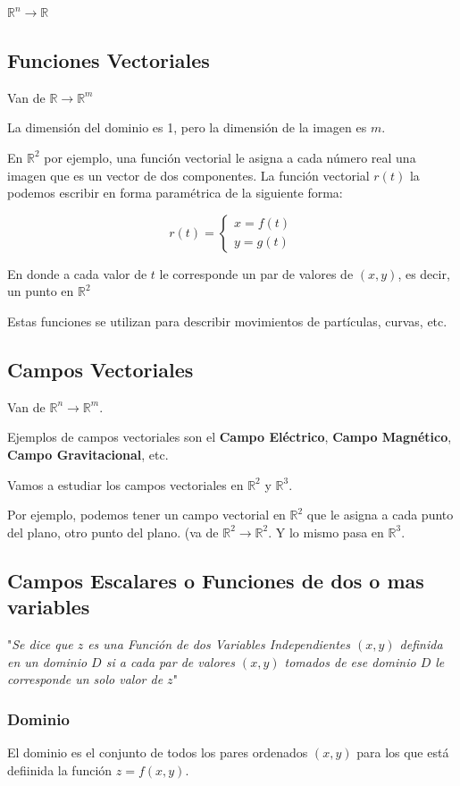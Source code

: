 \documentclass[12pt]{article}
\begin{document}
$ \mathbb{{R}}^n \to \mathbb{{R}} $

\subsection*{Funciones Vectoriales}
Van de $ \mathbb{{R}} \to \mathbb{{R}}^m $

La dimensión del dominio es 1, pero la dimensión de la imagen es $ m $.

En $ \mathbb{{R}}^2  $ por ejemplo, una función vectorial le asigna a cada número real una imagen que es un vector de dos componentes. La función vectorial $ r(t) $ la podemos escribir en forma paramétrica de la siguiente forma:

\[
	r(t) =
	\begin{cases}
		x = f(t) \\
		y = g(t)
	\end{cases}
\]

En donde a cada valor de $ t $ le corresponde un par de valores de $ (x,y) $, es decir, un punto en $ \mathbb{R}^{2} $

Estas funciones se utilizan para describir movimientos de partículas, curvas, etc.

\subsection*{Campos Vectoriales}
Van de $ \mathbb{R}^{n}\to\mathbb{R}^{m} $.

Ejemplos de campos vectoriales son el \textbf{Campo Eléctrico}, \textbf{Campo Magnético}, \textbf{Campo Gravitacional}, etc.

Vamos a estudiar los campos vectoriales en $ \mathbb{R}^{2} $ y $ \mathbb{R}^{3} $.

Por ejemplo, podemos tener un campo vectorial en $ \mathbb{R}^{2} $ que le asigna a cada punto del plano, otro punto del plano. (va de $ \mathbb{R}^{2}\to\mathbb{R}^{2} $. Y lo mismo pasa en $ \mathbb{R}^{3} $.

\subsection{Campos Escalares o Funciones de dos o mas variables}
"\textit{Se dice que $ z $ es una Función de dos Variables Independientes $ (x, y) $ definida en un dominio $ D $ si a cada par de valores $ (x, y) $ tomados de ese dominio $ D $ le corresponde un solo valor de $ z $}"\parencite{am2monllor}

\subsubsection*{Dominio}
El dominio es el conjunto de todos los pares ordenados $ (x, y) $ para los que está defiinida la función $ z = f(x,y) $.
\end{document}
